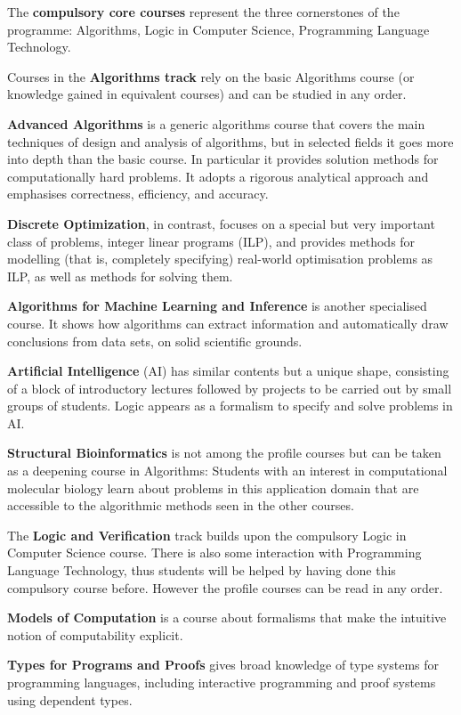 \documentclass[twocolumn]{article}
\begin{document}
\bigskip
%
The {\bf compulsory core courses} represent the three cornerstones of the
programme: Algorithms, Logic in Computer Science, Programming Language
Technology.

\bigskip
%
Courses in the {\bf Algorithms track} rely on the basic Algorithms course (or
knowledge gained in equivalent courses) and can be studied in any order.

{\bf Advanced Algorithms} is a generic algorithms course that covers
the main techniques of design and analysis of algorithms, but in
selected fields it goes more into depth than the basic course. In
particular it provides solution methods for computationally hard
problems. It adopts a rigorous analytical approach and emphasises
correctness, efficiency, and accuracy.

{\bf Discrete Optimization}, in contrast, focuses on a special but
very important class of problems, integer linear programs (ILP), and
provides methods for modelling (that is, completely specifying)
real-world optimisation problems as ILP, as well as methods for
solving them.

{\bf Algorithms for Machine Learning and Inference} is another
specialised course. It shows how algorithms can extract information
and automatically draw conclusions from data sets, on solid scientific
grounds.

{\bf Artificial Intelligence} (AI) has similar contents but a unique
shape, consisting of a block of introductory lectures followed by
projects to be carried out by small groups of students. Logic appears
as a formalism to specify and solve problems in AI.

{\bf Structural Bioinformatics} is not among the profile courses but
can be taken as a deepening course in Algorithms: Students with an
interest in computational molecular biology learn about problems in
this application domain that are accessible to the algorithmic methods
seen in the other courses.

\bigskip
%
The {\bf Logic and Verification} track builds upon the compulsory
Logic in Computer Science course. There is also some interaction with
Programming Language Technology, thus students will be helped by
having done this compulsory course before. However the profile courses
can be read in any order.

{\bf Models of Computation} is a course about formalisms that make the
intuitive notion of computability explicit.

{\bf Types for Programs and Proofs} gives broad knowledge of type
systems for programming languages, including interactive programming
and proof systems using dependent types.
\end{document}
